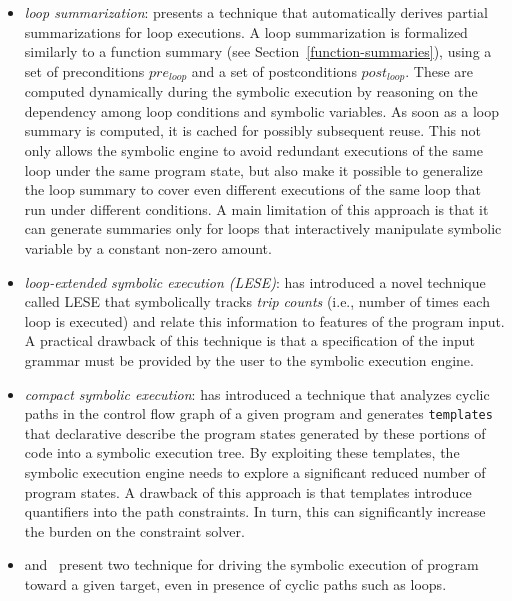 \begin{itemize}
  \item {\em loop summarization}: \cite{GL-ISSTA11} presents a technique that automatically derives partial summarizations for loop executions. A loop summarization is formalized similarly to a function summary (see Section~\ref{function-summaries}), using a set of preconditions $pre_{loop}$ and a set of postconditions $post_{loop}$. These are computed dynamically during the symbolic execution by reasoning on the dependency among loop conditions and symbolic variables. As soon as a loop summary is computed, it is cached for possibly subsequent reuse. This not only allows the symbolic engine to avoid redundant executions of the same loop under the same program state, but also make it possible to generalize the loop summary to cover even different executions of the same loop that run under different conditions. A main limitation of this approach is that it can generate summaries only for loops that interactively manipulate symbolic variable by a constant non-zero amount.

  \item {\em loop-extended symbolic execution (LESE)}: \cite{SPM-ISSTA09} has introduced a novel technique called LESE that symbolically tracks {\em trip counts} (i.e., number of times each loop is executed) and relate this information to features of the program input. A practical drawback of this technique is that a specification of the input grammar must be provided by the user to the symbolic execution engine.

  \item {\em compact symbolic execution}: \cite{SST-ATVA13} has introduced a technique that analyzes cyclic paths in the control flow graph of a given program and generates {\tt templates} that declarative describe the program states generated by these portions of code into a symbolic execution tree. By exploiting these templates, the symbolic execution engine needs to explore a significant reduced number of program states. A drawback of this approach is that templates introduce quantifiers into the path constraints. In turn, this can significantly increase the burden on the constraint solver.

  \item \cite{ST-ISSTA12} and~\cite{OT-ATVA11} present two technique for driving the symbolic execution of program toward a given target, even in presence of cyclic paths such as loops.
\end{itemize}

